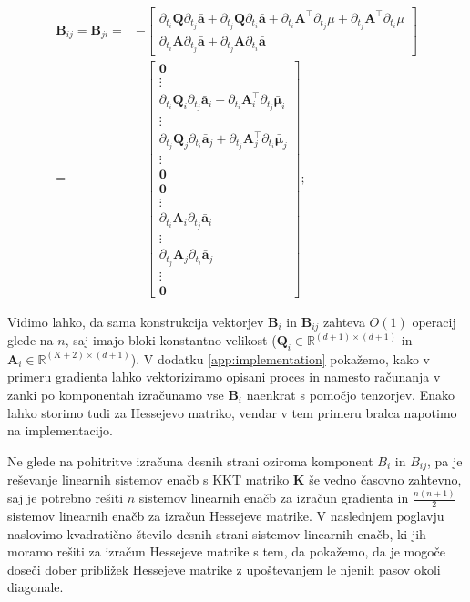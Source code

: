 \documentclass[isrm2, tisk]{fmfdelo}
\newcommand{\aimplicit}{\bar{\mathbf{a}}}
\newcommand{\muimplicit}{\bar{\boldsymbol{\mu}}}
\newcommand{\qmat}{\mathbf{Q}}
\newcommand{\amat}{\mathbf{A}}
\newcommand{\kmat}{\mathbf{K}}
\begin{document}
\begin{equation}
    \begin{aligned}
        \mathbf{B}_{ij} = \mathbf{B}_{ji} =& - \begin{bmatrix}
        \partial_{t_i}\qmat\partial_{t_j}\aimplicit + \partial_{t_j}\qmat\partial_{t_i}\aimplicit + \partial_{t_i} \amat^{\top}\partial_{t_j}\mu + \partial_{t_j}\amat^{\top}\partial_{t_i}\mu \\
        \partial_{t_i}\amat\partial_{t_j}\aimplicit + \partial_{t_j}\amat\partial_{t_i}\aimplicit
    \end{bmatrix} \\
    =& - \begin{bmatrix}
        \mathbf{0} \\
        \vdots \\
        \partial_{t_i}\qmat_i\partial_{t_j}\aimplicit_i + \partial_{t_i}\amat_i^{\top}\partial_{t_j}\muimplicit_i \\
        \vdots \\
        \partial_{t_j}\qmat_j\partial_{t_i}\aimplicit_j + \partial_{t_j}\amat_j^{\top}\partial_{t_i}\muimplicit_j \\
        \vdots \\
        \mathbf{0} \\
        \mathbf{0} \\
        \vdots \\
        \partial_{t_i}\amat_i\partial_{t_j}\aimplicit_i\\
        \vdots \\
        \partial_{t_j}\amat_j\partial_{t_i}\aimplicit_j\\
        \vdots \\
        \mathbf{0}
    \end{bmatrix};
    \end{aligned}
\end{equation}

Vidimo lahko, da sama konstrukcija vektorjev $\mathbf{B}_i$ in $\mathbf{B}_{ij}$ zahteva $O(1)$ operacij glede na $n$, saj imajo bloki konstantno velikost ($\qmat_i \in \mathbb{R}^{(d+1)\times(d+1)}$ in $\amat_i \in \mathbb{R}^{(K+2) \times (d+1)}$). V dodatku \ref{app:implementation} pokažemo, kako v primeru gradienta lahko vektoriziramo opisani proces in namesto računanja v zanki po komponentah izračunamo vse $\mathbf{B}_i$ naenkrat s pomočjo tenzorjev. Enako lahko storimo tudi za Hessejevo matriko, vendar v tem primeru bralca napotimo na implementacijo.

Ne glede na pohitritve izračuna desnih strani oziroma komponent $B_i$ in $B_{ij}$, pa je reševanje linearnih sistemov enačb s \ac{KKT} matriko $\kmat$ še vedno časovno zahtevno, saj je potrebno rešiti $n$ sistemov linearnih enačb za izračun gradienta in $\frac{n(n+1)}{2}$ sistemov linearnih enačb za izračun Hessejeve matrike. V naslednjem poglavju naslovimo kvadratično število desnih strani sistemov linearnih enačb, ki jih moramo rešiti za izračun Hessejeve matrike s tem, da pokažemo, da je mogoče doseči dober približek Hessejeve matrike z upoštevanjem le njenih pasov okoli diagonale.
\end{document}
